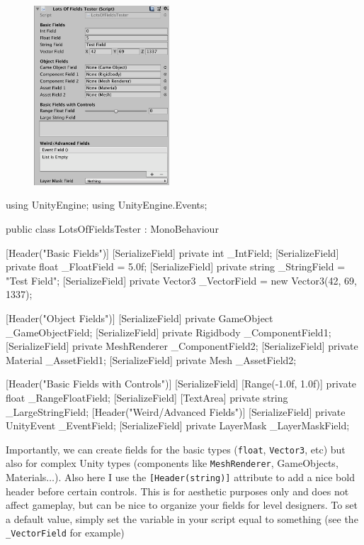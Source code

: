 \documentclass[11pt]{article}
\def\StartLineAt#1{\lstset{firstnumber=#1}}
\begin{document}

\begin{figure}
    \vspace*{20em}
    \includegraphics[width=0.45\textwidth]{lots-of-fields}
\end{figure}
\StartLineAt{1}
\begin{csharp}
using UnityEngine;
using UnityEngine.Events;

public class LotsOfFieldsTester : MonoBehaviour
{
    [Header("Basic Fields")]
    [SerializeField]
    private int _IntField;
    [SerializeField]
    private float _FloatField = 5.0f;
    [SerializeField]
    private string _StringField = "Test Field";
    [SerializeField]
    private Vector3 _VectorField = new Vector3(42, 69, 1337);

    [Header("Object Fields")]
    [SerializeField]
    private GameObject _GameObjectField;
    [SerializeField]
    private Rigidbody _ComponentField1;
    [SerializeField]
    private MeshRenderer _ComponentField2;
    [SerializeField]
    private Material _AssetField1;
    [SerializeField]
    private Mesh _AssetField2;

    [Header("Basic Fields with Controls")]
    [SerializeField]
    [Range(-1.0f, 1.0f)]
    private float _RangeFloatField;
    [SerializeField]
    [TextArea]
    private string _LargeStringField;
    [Header("Weird/Advanced Fields")]
    [SerializeField]
    private UnityEvent _EventField;
    [SerializeField]
    private LayerMask _LayerMaskField;
}
\end{csharp}

Importantly, we can create fields for the basic types (\lstinline|float|, \lstinline|Vector3|, etc)
but also for complex Unity types (components like \lstinline|MeshRenderer|, GameObjects, Materials$\dots$).
Also here I use the \lstinline|[Header(string)]| attribute to add a nice bold header before certain
controls.  This is for aesthetic purposes only and does not affect gameplay, but can be nice to
organize your fields for level designers.  To set a default value, simply set the variable in your
script equal to something (see the \lstinline|_VectorField| for example)
\end{document}
